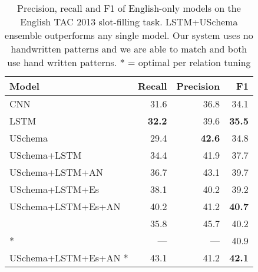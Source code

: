 \begin{table}[tb]
\begin{center}
\caption{Precision, recall and F1 of English-only models on the English TAC 2013 slot-filling task. LSTM+USchema ensemble outperforms any single model. Our system uses no handwritten patterns and we are able to match \protect\citet{roth2014relationfactory} and \protect\citet{angeli2014stanford} both use hand written patterns. * = optimal per relation tuning\label{en-tac-table}}
\begin{tabular}{|lrrr|}
\hline
\bf Model & \bf Recall & \bf Precision & \bf F1 \\
\hline\hline
CNN                 & 31.6 & 36.8 & 34.1 \\
LSTM                & \bf 32.2 & 39.6 & \bf 35.5  \\
USchema             & 29.4 & \bf 42.6 & 34.8 \\
\hline\hline
USchema+LSTM        & 34.4 & 41.9 & 37.7 \\
USchema+LSTM+AN	& 36.7 & 43.1 & 39.7 \\
USchema+LSTM+Es        & 38.1 & 40.2 & 39.2 \\
USchema+LSTM+Es+AN & 40.2 & 41.2 & \bf 40.7 \\
\citet{roth2014relationfactory} & 35.8 & 45.7 & 40.2 \\
\hline\hline
\citet{angeli2014stanford}* & --- & --- & 40.9 \\
USchema+LSTM+Es+AN * &	43.1 & 41.2	& \bf 42.1 \\

\hline
\end{tabular}
\end{center}
\end{table}




